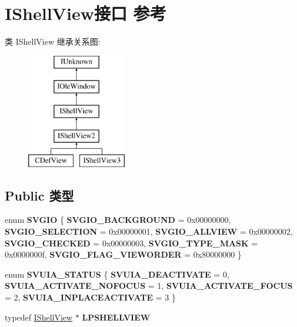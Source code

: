 \hypertarget{interface_i_shell_view}{}\section{I\+Shell\+View接口 参考}
\label{interface_i_shell_view}
类 I\+Shell\+View 继承关系图\+:\begin{figure}[H]
\begin{center}
\leavevmode
\includegraphics[height=5.000000cm]{interface_i_shell_view}
\end{center}
\end{figure}
\subsection*{Public 类型}
\begin{DoxyCompactItemize}
\item 
\mbox{\label{interface_i_shell_view_ac3979bca9d286360b55a5e3e233f3e4c}} 
enum {\bfseries S\+V\+G\+IO} \{ \newline
{\bfseries S\+V\+G\+I\+O\+\_\+\+B\+A\+C\+K\+G\+R\+O\+U\+ND} = 0x00000000, 
{\bfseries S\+V\+G\+I\+O\+\_\+\+S\+E\+L\+E\+C\+T\+I\+ON} = 0x00000001, 
{\bfseries S\+V\+G\+I\+O\+\_\+\+A\+L\+L\+V\+I\+EW} = 0x00000002, 
{\bfseries S\+V\+G\+I\+O\+\_\+\+C\+H\+E\+C\+K\+ED} = 0x00000003, 
\newline
{\bfseries S\+V\+G\+I\+O\+\_\+\+T\+Y\+P\+E\+\_\+\+M\+A\+SK} = 0x0000000f, 
{\bfseries S\+V\+G\+I\+O\+\_\+\+F\+L\+A\+G\+\_\+\+V\+I\+E\+W\+O\+R\+D\+ER} = 0x80000000
 \}
\item 
\mbox{\label{interface_i_shell_view_a2814358e72b85141a970ace7514bbbb1}} 
enum {\bfseries S\+V\+U\+I\+A\+\_\+\+S\+T\+A\+T\+US} \{ {\bfseries S\+V\+U\+I\+A\+\_\+\+D\+E\+A\+C\+T\+I\+V\+A\+TE} = 0, 
{\bfseries S\+V\+U\+I\+A\+\_\+\+A\+C\+T\+I\+V\+A\+T\+E\+\_\+\+N\+O\+F\+O\+C\+US} = 1, 
{\bfseries S\+V\+U\+I\+A\+\_\+\+A\+C\+T\+I\+V\+A\+T\+E\+\_\+\+F\+O\+C\+US} = 2, 
{\bfseries S\+V\+U\+I\+A\+\_\+\+I\+N\+P\+L\+A\+C\+E\+A\+C\+T\+I\+V\+A\+TE} = 3
 \}
\item 
\mbox{\label{interface_i_shell_view_a9d1429ae4ce12fadbba7badcb0c053f7}} 
typedef \hyperlink{interface_i_shell_view}{I\+Shell\+View} $\ast$ {\bfseries L\+P\+S\+H\+E\+L\+L\+V\+I\+EW}
\end{DoxyCompactItemize}
